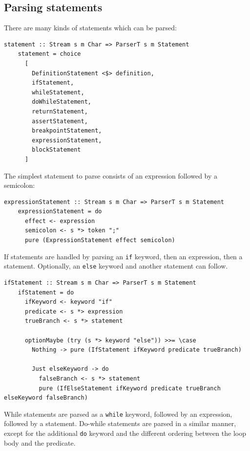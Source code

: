 \documentclass[UdineBachThesis,american,11pt]{PhdThesis}
\begin{document}
  \subsection{Parsing statements}

  There are many kinds of statements which can be parsed:

  \begin{Verbatim}[gobble=4,fontsize=\small]
    statement :: Stream s m Char => ParserT s m Statement
    statement = choice
      [
        DefinitionStatement <$> definition,
        ifStatement,
        whileStatement,
        doWhileStatement,
        returnStatement,
        assertStatement,
        breakpointStatement,
        expressionStatement,
        blockStatement
      ]
  \end{Verbatim}

  The simplest statement to parse consists of an expression followed by a
  semicolon:

  \begin{Verbatim}[gobble=4,fontsize=\small]
    expressionStatement :: Stream s m Char => ParserT s m Statement
    expressionStatement = do
      effect <- expression
      semicolon <- s *> token ";"
      pure (ExpressionStatement effect semicolon)
  \end{Verbatim}

  If statements are handled by parsing an \mbox{\texttt{if}} keyword, then an
  expression, then a statement. Optionally, an \mbox{\texttt{else}} keyword and
  another statement can follow.

  \begin{Verbatim}[gobble=4,fontsize=\small]
    ifStatement :: Stream s m Char => ParserT s m Statement
    ifStatement = do
      ifKeyword <- keyword "if"
      predicate <- s *> expression
      trueBranch <- s *> statement

      optionMaybe (try (s *> keyword "else")) >>= \case
        Nothing -> pure (IfStatement ifKeyword predicate trueBranch)

        Just elseKeyword -> do
          falseBranch <- s *> statement
          pure (IfElseStatement ifKeyword predicate trueBranch elseKeyword falseBranch)
  \end{Verbatim}

  While statements are parsed as a \mbox{\texttt{while}} keyword, followed by an
  expression, followed by a statement. Do-while statements are parsed in a
  similar manner, except for the additional \mbox{\texttt{do}} keyword and the
  different ordering between the loop body and the predicate.
\end{document}
